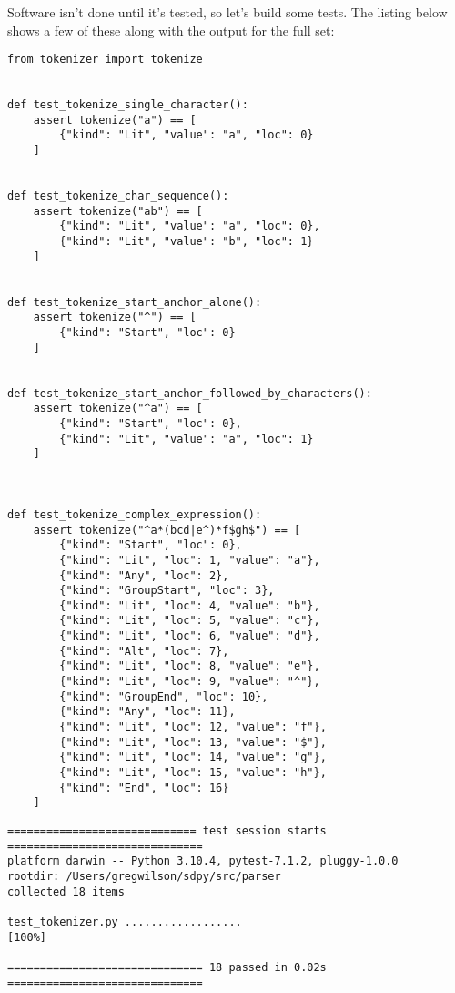 \documentclass{scrbook}
\begin{document}
Software isn't done until it's tested,
so let's build some tests.
The listing below shows a few of these
along with the output for the full set:


\begin{lstlisting}[frame=single,frameround=tttt]
from tokenizer import tokenize


def test_tokenize_single_character():
    assert tokenize("a") == [
        {"kind": "Lit", "value": "a", "loc": 0}
    ]


def test_tokenize_char_sequence():
    assert tokenize("ab") == [
        {"kind": "Lit", "value": "a", "loc": 0},
        {"kind": "Lit", "value": "b", "loc": 1}
    ]


def test_tokenize_start_anchor_alone():
    assert tokenize("^") == [
        {"kind": "Start", "loc": 0}
    ]


def test_tokenize_start_anchor_followed_by_characters():
    assert tokenize("^a") == [
        {"kind": "Start", "loc": 0},
        {"kind": "Lit", "value": "a", "loc": 1}
    ]



def test_tokenize_complex_expression():
    assert tokenize("^a*(bcd|e^)*f$gh$") == [
        {"kind": "Start", "loc": 0},
        {"kind": "Lit", "loc": 1, "value": "a"},
        {"kind": "Any", "loc": 2},
        {"kind": "GroupStart", "loc": 3},
        {"kind": "Lit", "loc": 4, "value": "b"},
        {"kind": "Lit", "loc": 5, "value": "c"},
        {"kind": "Lit", "loc": 6, "value": "d"},
        {"kind": "Alt", "loc": 7},
        {"kind": "Lit", "loc": 8, "value": "e"},
        {"kind": "Lit", "loc": 9, "value": "^"},
        {"kind": "GroupEnd", "loc": 10},
        {"kind": "Any", "loc": 11},
        {"kind": "Lit", "loc": 12, "value": "f"},
        {"kind": "Lit", "loc": 13, "value": "$"},
        {"kind": "Lit", "loc": 14, "value": "g"},
        {"kind": "Lit", "loc": 15, "value": "h"},
        {"kind": "End", "loc": 16}
    ]
\end{lstlisting}



\begin{lstlisting}[frame=single,frameround=tttt]
============================= test session starts ==============================
platform darwin -- Python 3.10.4, pytest-7.1.2, pluggy-1.0.0
rootdir: /Users/gregwilson/sdpy/src/parser
collected 18 items

test_tokenizer.py ..................                                     [100%]

============================== 18 passed in 0.02s ==============================
\end{lstlisting}
\end{document}
